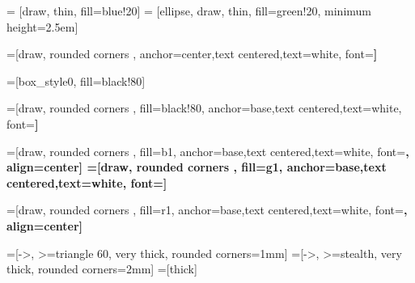 
\usepackage[utf8]{inputenc}
\usepackage{lmodern}
\usepackage[T1]{fontenc}


\usepackage{array}
\usepackage{mathtools}%
\usepackage{wasysym}
\usepackage{amsfonts}
\usepackage{amssymb, amsbsy}
\usepackage[utf8]{inputenc}
\usepackage{graphicx}
\usepackage{multimedia}
\usepackage{multicol}
\usepackage{multirow}
\usepackage{fourier}
\usepackage{makecell}






\usepackage{tikz}
\usetikzlibrary{shapes,arrows,shadows,calc, angles}
\usetikzlibrary{arrows,shapes}
\usetikzlibrary{positioning}

\usepackage{verbatim}

 = [draw, thin, fill=blue!20]
 = [ellipse, draw, thin, fill=green!20, minimum height=2.5em]


=[draw, rounded corners ,
anchor=center,text centered,text=white, font=\bfseries] %

=[box_style0, fill=black!80] %

=[draw, rounded corners , fill=black!80,
anchor=base,text centered,text=white, font=\bfseries] %

=[draw, rounded corners , fill=b1,
anchor=base,text centered,text=white, font=\bfseries, align=center] %
=[draw, rounded corners , fill=g1,
anchor=base,text centered,text=white, font=\bfseries] %

=[draw, rounded corners , fill=r1,
anchor=base,text centered,text=white, font=\bfseries, align=center] %

=[->, >=triangle 60, very thick, rounded corners=1mm]
=[->, >=stealth, very thick, rounded corners=2mm]
=[thick]


